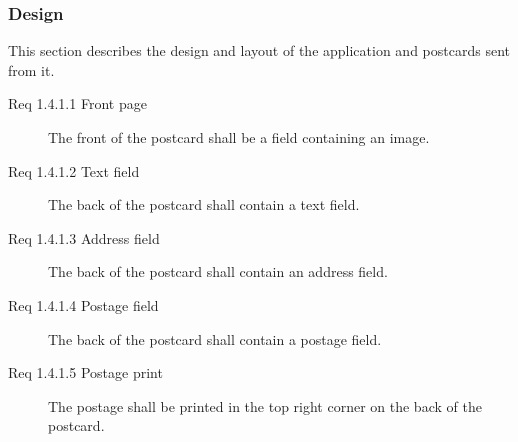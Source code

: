 \documentclass[10pt,a4paper]{article}
\begin{document}
\subsubsection{Design}
This section describes the design and layout of the application and postcards sent from it. 
\begin {description}
\item [Req 1.4.1.1 Front page] The front of the postcard shall be a field containing an image.
\item [Req 1.4.1.2 Text field] The back of the postcard shall contain a text field.
\item [Req 1.4.1.3 Address field] The back of the postcard shall contain an address field.
\item [Req 1.4.1.4 Postage field] The back of the postcard shall contain a postage field. 
\item [Req 1.4.1.5 Postage print] The postage shall be printed in the top right corner on the back of the postcard. 


\end{description}
\end{document}
